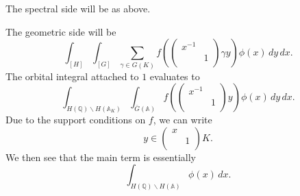 \documentclass[reqno]{amsart} 
\begin{document}
The spectral side will be as above.

The geometric side will be
\begin{equation*}
  \int_{[H]} \int_{[G]}
  \sum_{\gamma \in G(K)} f \left(
    \begin{pmatrix}
      x^{-1}       &  \\
                   & 1 \\
    \end{pmatrix} \gamma y \right)
  \phi(x) \, d y \,d x.
\end{equation*}
The orbital integral attached to $1$ evaluates to
\begin{equation*}
  \int_{H(\mathbb{Q}) \backslash H(\mathbb{A}_K)} \int_{\bar{G}(\mathbb{A})} f \left(
    \begin{pmatrix}
      x^{-1}       &  \\
                   & 1 \\
    \end{pmatrix}
    y
  \right)
  \phi(x) \,d y \,d x.
\end{equation*}
Due to the support conditions on $f$, we can write
\begin{equation*}
  y \in
  \begin{pmatrix}
    x    &  \\
         & 1 \\
  \end{pmatrix} K.
\end{equation*}
We then see that the main term is essentially
\begin{equation*}
  \int_{H(\mathbb{Q}) \backslash H(\mathbb{A})} \phi(x) \,d x.
\end{equation*}
\end{document}
